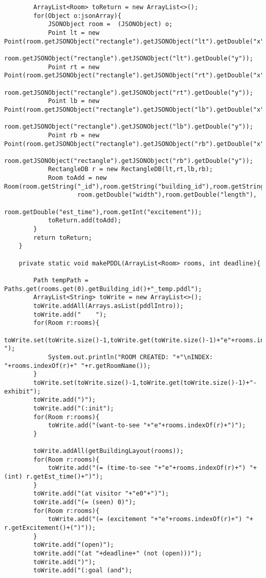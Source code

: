 \begin{lstlisting}
        ArrayList<Room> toReturn = new ArrayList<>();
        for(Object o:jsonArray){
            JSONObject room =  (JSONObject) o;
            Point lt = new Point(room.getJSONObject("rectangle").getJSONObject("lt").getDouble("x"),
                    room.getJSONObject("rectangle").getJSONObject("lt").getDouble("y"));
            Point rt = new Point(room.getJSONObject("rectangle").getJSONObject("rt").getDouble("x"),
                    room.getJSONObject("rectangle").getJSONObject("rt").getDouble("y"));
            Point lb = new Point(room.getJSONObject("rectangle").getJSONObject("lb").getDouble("x"),
                    room.getJSONObject("rectangle").getJSONObject("lb").getDouble("y"));
            Point rb = new Point(room.getJSONObject("rectangle").getJSONObject("rb").getDouble("x"),
                    room.getJSONObject("rectangle").getJSONObject("rb").getDouble("y"));
            RectangleDB r = new RectangleDB(lt,rt,lb,rb);
            Room toAdd = new Room(room.getString("_id"),room.getString("building_id"),room.getString("name"),r,
                    room.getDouble("width"),room.getDouble("length"),
                    room.getDouble("est_time"),room.getInt("excitement"));
            toReturn.add(toAdd);
        }
        return toReturn;
    }

    private static void makePDDL(ArrayList<Room> rooms, int deadline){

        Path tempPath = Paths.get(rooms.get(0).getBuilding_id()+"_temp.pddl");
        ArrayList<String> toWrite = new ArrayList<>();
        toWrite.addAll(Arrays.asList(pddlIntro));
        toWrite.add("    ");
        for(Room r:rooms){
            toWrite.set(toWrite.size()-1,toWrite.get(toWrite.size()-1)+"e"+rooms.indexOf(r)+" ");
            System.out.println("ROOM CREATED: "+"\nINDEX: "+rooms.indexOf(r)+" "+r.getRoomName());
        }
        toWrite.set(toWrite.size()-1,toWrite.get(toWrite.size()-1)+"- exhibit");
        toWrite.add(")");
        toWrite.add("(:init");
        for(Room r:rooms){
            toWrite.add("(want-to-see "+"e"+rooms.indexOf(r)+")");
        }

        toWrite.addAll(getBuildingLayout(rooms));
        for(Room r:rooms){
            toWrite.add("(= (time-to-see "+"e"+rooms.indexOf(r)+") "+(int) r.getEst_time()+")");
        }
        toWrite.add("(at visitor "+"e0"+")");
        toWrite.add("(= (seen) 0)");
        for(Room r:rooms){
            toWrite.add("(= (excitement "+"e"+rooms.indexOf(r)+") "+ r.getExcitement()+(")"));
        }
        toWrite.add("(open)");
        toWrite.add("(at "+deadline+" (not (open)))");
        toWrite.add(")");
        toWrite.add("(:goal (and");


\end{lstlisting}
